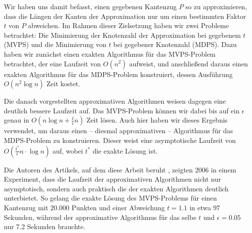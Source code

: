 Wir haben uns damit befasst, einen gegebenen Kantenzug $P$ so zu approximieren, dass die Längen der Kanten der Approximation nur um einen bestimmten Faktor $t$ von $P$ abweichen. 
Im Rahmen dieser Zielsetzung haben wir zwei Probleme betrachtet: Die Minimierung der Knotenzahl der Approximation bei gegebenem $t$ (MVPS) und die Minimierung von $t$ bei gegebener Knotenzahl (MDPS).
Dazu haben wir zunächst einen exakten Algorithmus für das MVPS-Problem betrachtet, der eine Laufzeit von $O(n^2)$ aufweist, und anschließend daraus einen exakten Algorithmus für das MDPS-Problem konstruiert, dessen Ausführung $O(n^2 \log n)$ Zeit kostet.

Die danach vorgestellten approximativen Algorithmen weisen dagegen eine deutlich bessere Laufzeit auf.
Das MVPS-Problem können wir dabei bis auf ein $\epsilon$ genau in $O(n \log n + \frac{t}{\epsilon}n)$ Zeit lösen.
Auch hier haben wir dieses Ergebnis verwendet, um daraus einen -- diesmal approximativen -- Algorithmus für das MDPS-Problem zu konstruieren. Dieser weist eine asymptotische Laufzeit von $O(\frac{t^*}{\epsilon}n \cdot \log n)$ auf, wobei $t^*$ die exakte Lösung ist.

Die Autoren des Artikels, auf dem diese Arbeit beruht \cite{gudmundsson}, zeigten 2006 in einem Experiment, dass die Laufzeit der approximativen Algorithmen nicht nur asymptotisch, sondern auch praktisch die der exakten Algorithmen deutlich unterbietet.
So gelang die exakte Lösung des MVPS-Problems für einen Kantenzug mit $20.000$ Punkten und einer Abweichung $t = 1.1$ in etwa 97 Sekunden, während der approximative Algorithmus für das selbe $t$ und $\epsilon = 0.05$ nur 7.2 Sekunden brauchte.